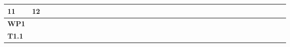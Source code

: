 \begin{table}[h]
{\begin{tabular}{|l|llllllllllll|llllllllllll|llllllllllll|}
  \multicolumn{1}{l|}{{\color[HTML]{FE0000} \textbf{11}}} &
  {\color[HTML]{FE0000} \textbf{12}} \\ \hline
\textbf{WP1} &
  \multicolumn{1}{l|}{\cellcolor[HTML]{DDD9C3}} &
  \multicolumn{1}{l|}{\cellcolor[HTML]{DDD9C3}} &
  \multicolumn{1}{l|}{\cellcolor[HTML]{DDD9C3}} &
  \multicolumn{1}{l|}{\cellcolor[HTML]{DDD9C3}} &
  \multicolumn{1}{l|}{\cellcolor[HTML]{DDD9C3}} &
  \multicolumn{1}{l|}{\cellcolor[HTML]{DDD9C3}} &
  \multicolumn{1}{l|}{\cellcolor[HTML]{DDD9C3}} &
  \multicolumn{1}{l|}{\cellcolor[HTML]{DDD9C3}} &
  \multicolumn{1}{l|}{\cellcolor[HTML]{DDD9C3}} &
  \multicolumn{1}{l|}{\cellcolor[HTML]{DDD9C3}} &
  \multicolumn{1}{l|}{\cellcolor[HTML]{DDD9C3}} &
  \multicolumn{1}{l|}{\cellcolor[HTML]{DDD9C3}} &
  \multicolumn{1}{l|}{\cellcolor[HTML]{DDD9C3}} &
  \multicolumn{1}{l|}{\cellcolor[HTML]{DDD9C3}} &
  \multicolumn{1}{l|}{\cellcolor[HTML]{DDD9C3}} &
  \multicolumn{1}{l|}{\cellcolor[HTML]{DDD9C3}} &
  \multicolumn{1}{l|}{\cellcolor[HTML]{DDD9C3}} &
  \multicolumn{1}{l|}{\cellcolor[HTML]{DDD9C3}} &
  \multicolumn{1}{l|}{\cellcolor[HTML]{DDD9C3}} &
  \multicolumn{1}{l|}{\cellcolor[HTML]{DDD9C3}} &
  \multicolumn{1}{l|}{\cellcolor[HTML]{DDD9C3}} &
  \multicolumn{1}{l|}{\cellcolor[HTML]{DDD9C3}} &
  \multicolumn{1}{l|}{\cellcolor[HTML]{DDD9C3}} &
   \multicolumn{1}{l|}{\cellcolor[HTML]{DDD9C3}} &
  \multicolumn{1}{l|}{\cellcolor[HTML]{DDD9C3}} &
  \multicolumn{1}{l|}{\cellcolor[HTML]{DDD9C3}} &
  \multicolumn{1}{l|}{\cellcolor[HTML]{DDD9C3}} &
  \multicolumn{1}{l|}{\cellcolor[HTML]{DDD9C3}} &
  \multicolumn{1}{l|}{\cellcolor[HTML]{DDD9C3}} &
  \multicolumn{1}{l|}{\cellcolor[HTML]{DDD9C3}} &
  \multicolumn{1}{l|}{\cellcolor[HTML]{DDD9C3}} &
  \multicolumn{1}{l|}{\cellcolor[HTML]{DDD9C3}} &
  \multicolumn{1}{l|}{\cellcolor[HTML]{DDD9C3}} &
  \multicolumn{1}{l|}{} &
  \multicolumn{1}{l|}{} &
  \multicolumn{1}{l|}{} 
\\ \hline
\textbf{T1.1} &
  \multicolumn{1}{l|}{\cellcolor[HTML]{FBD4B4}} &
  \multicolumn{1}{l|}{\cellcolor[HTML]{FBD4B4}} &
  \multicolumn{1}{l|}{\cellcolor[HTML]{FBD4B4}} &
  \multicolumn{1}{l|}{\cellcolor[HTML]{FBD4B4}} &
  \multicolumn{1}{l|}{\cellcolor[HTML]{FBD4B4}} &
  \multicolumn{1}{l|}{\cellcolor[HTML]{FBD4B4}} &
  \multicolumn{1}{l|}{\cellcolor[HTML]{FBD4B4}} &
  \multicolumn{1}{l|}{\cellcolor[HTML]{FBD4B4}} &
  \multicolumn{1}{l|}{\cellcolor[HTML]{FBD4B4}} &
  \multicolumn{1}{l|}{\cellcolor[HTML]{FBD4B4}} &
  \multicolumn{1}{l|}{\cellcolor[HTML]{FBD4B4}} &
  \multicolumn{1}{l|}{\cellcolor[HTML]{FBD4B4}} &
  \multicolumn{1}{l|}{\cellcolor[HTML]{FBD4B4}} &

\end{tabular}}
\end{table}
